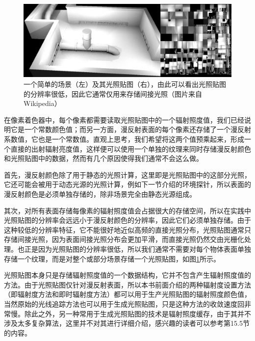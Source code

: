 \begin{figure}
\begin{fullwidth}
	\includegraphics[width=\thewidth]{figures/pl/pl-lightmap}
	\caption{一个简单的场景（左）及其光照贴图（右），由此可以看出光照贴图的分辨率很低，因此它通常仅用来存储间接光照（图片来自Wikipedia）}
	\label{f:pl-lightmap}
\end{fullwidth}
\end{figure}

在像素着色器中，每个像素都需要读取光照贴图中的一个辐射照度值，我们已经说明它是一个常数颜色值；而另一方面，漫反射表面的每个像素还存储了一个漫反射系数值，它也是一个常数值。直观上思考，我们希望将这两个值预乘起来，形成一个直接的出射辐射亮度值，这样便可以使用一个单独的纹理来同时存储漫反射颜色和光照贴图中的数据，然而有几个原因使得我们通常不会这么做。

首先，漫反射颜色除了用于静态的光照计算，这里即是光照贴图中的这部分光照，它还可能会被用于动态光源的光照计算，例如下一节介绍的环境探针，所以表面的漫反射颜色是必须单独存储的，除非场景完全由静态光源组成。

其次，对所有表面存储每像素的辐射照度值会占据很大的存储空间，所以在实践中光照贴图的分辨率会远远小于漫反射颜色的分辨率，因此它们必须单独存储。由于这种较低的分辨率特征，它不能很好地近似高频的直接光照分布，光照贴图通常只存储间接光照，因为表面间接光照分布会更加平滑，而直接光照仍然交由光栅化处理。也正是因为光照贴图的分辨率很低，所以我们通常不需要对每个物体表面单独存储一个纹理，而是对整个或部分场景存储一个光照贴图，如图\ref{f:pl-lightmap}所示。



光照贴图本身只是存储辐射照度值的一个数据结构，它并不包含产生辐射照度值的方法。由于光照贴图仅针对漫反射表面，所以本书前面介绍的两种辐射度设置方法（即辐射度方法和即时辐射度方法）都可以用于生产光照贴图的辐射照度颜色值，当然原始的光线追踪方法也可以用于生成光照贴图，只是这种方法的收敛速度回非常慢。除此之外，另一种常用于生成光照贴图的技术是辐射照度缓存，由于其并不涉及太多复杂算法，这里并不对其进行详细介绍，感兴趣的读者可以参考\cite{b:pbrt2}第15.5节的内容。

